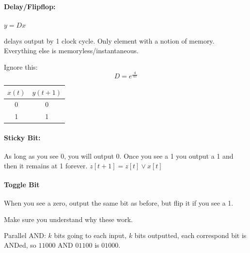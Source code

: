 \documentclass[12pt]{article}
\newcommand{\diffn}[1]{\,\mathrm{d}{#1}}
\newcommand{\fdiffn}[2]{\frac{\diffn{#1}}{\diffn{#2}}}
\begin{document}
\paragraph{Delay/Flipflop:} $y=Dx$ 
delays output by 1 clock cycle. Only element with a notion of memory. Everything else is memoryless/instantaneous.

Ignore this: \[D = e^{\fdiffn{}{x}}\]

\begin{tabular}{c|c}
$x(t)$&$y(t+1)$\\
\hline
0&0\\
1&1    
\end{tabular}
\paragraph{Sticky Bit:}
As long as you see 0, you will output 0. Once you see a 1 you output a 1 and then it remains at 1 forever. $z[t+1] = z[t] \vee x[t]$


\paragraph{Toggle Bit}
When you see a zero, output the same bit as before, but flip it if you see a 1.
Make sure you understand why these work.

Parallel AND: $k$ bits going to each input, $k$ bits outputted, each correspond bit is ANDed, so
$11000$ AND $01100$ is $01000.$ 
\end{document}
